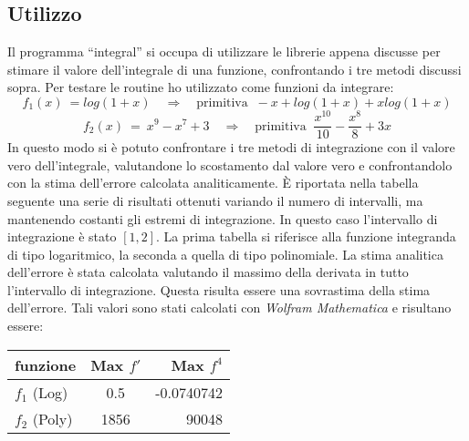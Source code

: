 \subsection*{Utilizzo}
Il programma ``integral'' si occupa di utilizzare le librerie appena discusse per stimare il valore dell'integrale di una funzione, confrontando i
tre metodi discussi sopra. Per testare le routine ho utilizzato come funzioni da integrare:
$$
  f_1 (x) \ = log ( 1+x) \quad \Rightarrow \quad \mbox{primitiva }\ -x + log(1 + x) + x log(1 + x)
$$
$$
 f_2 (x) \ = \ 	x^9 - x^7 + 3 \quad \Rightarrow \quad \mbox{primitiva }\  \frac{x^{10}}{10} - \frac{x^8}{8} + 3x
$$
In questo modo si è potuto confrontare i tre metodi di integrazione con il valore vero dell'integrale, valutandone
lo scostamento dal valore vero e confrontandolo con la stima dell'errore calcolata analiticamente.
È riportata nella tabella seguente una serie di risultati ottenuti variando il numero di intervalli, ma mantenendo costanti gli estremi di integrazione.
In questo caso l'intervallo di integrazione è stato $[1,2]$.
La prima tabella si riferisce alla funzione integranda di tipo logaritmico, la seconda a quella di tipo polinomiale.
La stima analitica dell'errore è stata calcolata valutando il massimo della derivata in tutto l'intervallo di integrazione.
Questa risulta essere una sovrastima della stima dell'errore. Tali valori sono stati calcolati con \emph{Wolfram Mathematica} e risultano essere:
\begin{center}
\begin{longtable}{lcr}
 \toprule
 funzione & Max $f'$ & Max $f^4$ \\
 \midrule
 $f_1$ (Log)  &  0.5 & -0.0740742 \\
 $f_2$ (Poly) &	1856 & 90048 \\
\end{longtable}
\end{center}

